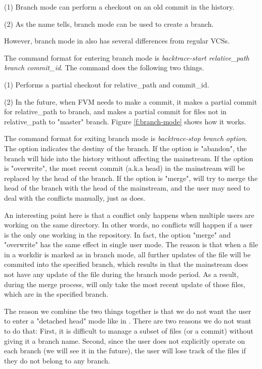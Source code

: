 (1) Branch mode can perform a checkout on an old commit in the history.

(2) As the name tells, branch mode can be used to create a branch.

However, branch mode in \sys also has several differences from regular VCSs.

The command format for entering branch mode is \textit{backtrace-start relative\_path
branch commit\_id}. The command does the following two things.

(1) Performs a partial checkout for relative\_path and commit\_id.

(2) In the future, when FVM needs to make a commit, it makes a partial
commit for relative\_path to branch, and makes a partial commit for files
not in relative\_path to "master" branch. Figure \ref{f:branch-mode} shows how
it works.

The command format for exiting branch mode is \textit{backtrace-stop branch
option}. The option indicates the destiny of the branch. If the option is
"abandon", the branch will hide into the history without affecting the
mainstream. If the option is "overwrite", the most recent
commit (a.k.a head) in the mainstream will be replaced by the head of the
branch. If the option is "merge", \sys will try to merge the head of the branch
with the head of the mainstream, and the user may need to deal with the
conflicts manually, just as \git does.

An interesting point here is that a conflict only happens when multiple users
are working on the same directory. In other words, no conflicts will happen if a
user is the only one working in the repository. In fact, the option "merge" and
"overwrite" has the same effect in single user mode. The reason is that when a
file in a workdir is marked as in branch mode, all further updates of the file
will be commited into the specified branch, which results in that the mainstream
does not have any update of the file during the branch mode period. As a result,
during the merge process, \sys will only take the most recent update of those
files, which are in the specified branch.

The reason we combine the two things together is that we do not want the
user to enter a "detached head" mode like in \git\cite{git}. There are two reasons we do not want to do that: First, it is
difficult to manage a subset of files (or a commit) without giving it a branch
name. Second, since the user does not explicitly operate on each branch (we will
see it in the future), the user will lose track of the files if they do not
belong to any branch.

